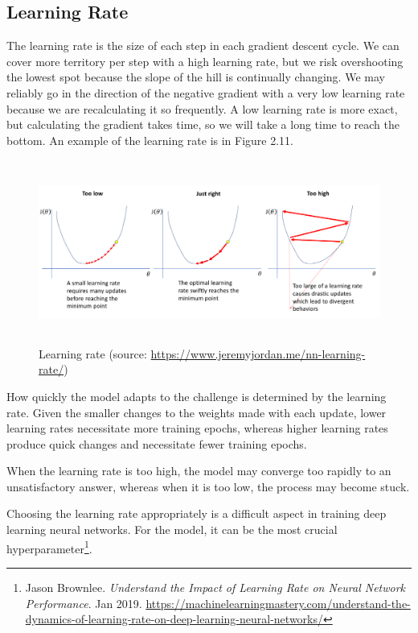 \subsection{Learning Rate}
\label{subsec:learning_rate}
\hspace{0.5cm}The learning rate is the size of each step in each gradient descent cycle. We can cover more territory per step with a high learning rate, but we risk overshooting the lowest spot because the slope of the hill is continually changing. We may reliably go in the direction of the negative gradient with a very low learning rate because we are recalculating it so frequently. A low learning rate is more exact, but calculating the gradient takes time, so we will take a long time to reach the bottom. An example of the learning rate is in Figure 2.11.
\begin{figure}[!h]
	\centering
	\includegraphics[width=\linewidth, height=6cm,keepaspectratio]{figures/learning rate.png}
   \caption{Learning rate (source: \url{https://www.jeremyjordan.me/nn-learning-rate/})}
\end{figure}

How quickly the model adapts to the challenge is determined by the learning rate. Given the smaller changes to the weights made with each update, lower learning rates necessitate more training epochs, whereas higher learning rates produce quick changes and necessitate fewer training epochs.

When the learning rate is too high, the model may converge too rapidly to an unsatisfactory answer, whereas when it is too low, the process may become stuck.

Choosing the learning rate appropriately is a difficult aspect in training deep learning neural networks. For the model, it can be the most crucial hyperparameter\footnote{Jason Brownlee. \textit{Understand the Impact of Learning Rate on Neural Network Performance}. Jan 2019. \url{https://machinelearningmastery.com/understand-the-dynamics-of-learning-rate-on-deep-learning-neural-networks/}}.

